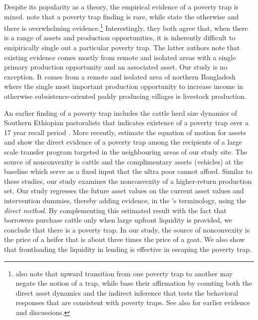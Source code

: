 	Despite its popularity as a theory, the empirical evidence of a poverty trap is mixed. \citet{KraayMcKenzie2014} note that a poverty trap finding is rare, while \citet{BarrettGargMcBride2016} state the otherwise and there is overwhelming evidence.\footnote{\citet{KraayMcKenzie2014} also note that upward transition from one poverty trap to another may negate the notion of a trap, while \citet{BarrettGargMcBride2016} base their affirmation by counting both the direct asset dynamics and the indirect inference that tests the behavioral responses that are consistent with poverty traps. See also \citet{CarterBarrett2006, BarrettCarter2013} for earlier evidence and discussions. } Interestingly, they both agree that, when there is a range of assets and production opportunities, it is inherently difficult to emipirically single out a particular poverty trap. The latter authors note that existing evidence comes mostly from remote and isolated areas with a single primary production opportunity and an associated asset. Our study is no exception. It comes from a remote and isolated area of northern Bangladesh where the single most important production opportunity to increase income in otherwise subsistence-oriented paddy producing villages is livestock production.  
	
	An earlier finding of a poverty trap includes the cattle herd size dynamics of Southern Ethiopian pastoralists that indicates existence of a poverty trap over a 17 year recall period \citep{Lybbertetal2004}. More recently, \citet{Balboni2020} estimate the equation of motion for assets and show the direct evidence of a poverty trap among the recipients of a large scale transfer program targeted in the neighbouring areas of our study site. The source of nonconvexity is cattle and the complimentary assets (vehicles) at the baseline which serve as a fixed input that the ultra poor cannot afford. Similar to these studies, our study examines the nonconvexity of a higher-return production set. Our study regresses the future asset values on the current asset values and intervention dummies, thereby adding evidence, in the \citet{BarrettGargMcBride2016}'s terminology, using the \textit{direct method}. %
	By complementing this estimated result with the fact that borrowers purchase cattle only when large upfront liquidity is provided, we conclude that there is a poverty trap. In our study, the source of nonconvexity is the price of a heifer that is about three times the price of a goat. We also show that frontloading the liquidity in lending is effective in escaping the poverty trap.

